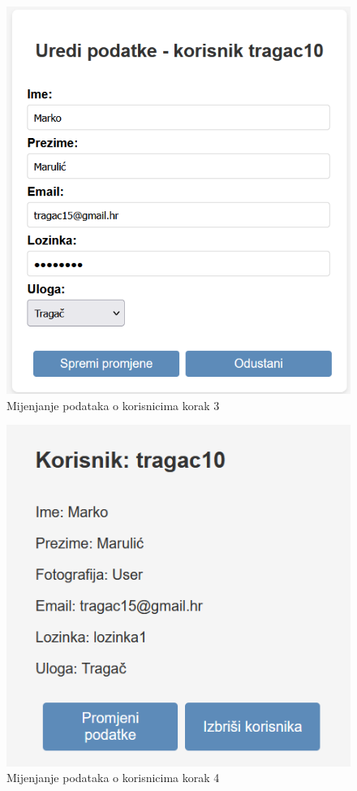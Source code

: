 			\begin{figure}[H]
				\includegraphics[scale=0.6]{slike/test13.png}
				\centering
				\caption{Mijenjanje podataka o korisnicima korak 3}
				\label{fig:Mijenjanje podataka o korisnicima korak 3}
			\end{figure}

			\begin{figure}[H]
				\includegraphics[scale=0.7]{slike/test14.png}
				\centering
				\caption{Mijenjanje podataka o korisnicima korak 4}
				\label{fig:Mijenjanje podataka o korisnicima korak 4}
			\end{figure}



